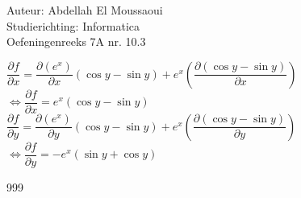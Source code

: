 \documentclass[a4paper]{article}
\begin{document}
  
\noindent \large Auteur: Abdellah El Moussaoui \\
\noindent \large Studierichting: Informatica\\
\noindent \large Oefeningenreeks 7A nr. 10.3\\

\medskip

\normalsize

$\dfrac{\partial f}{\partial x} = \dfrac{\partial (e^x)}{\partial x} (\cos y - \sin y) + e^x \left(\dfrac{\partial (\cos y - \sin y)}{\partial x}\right)$\\

$\Leftrightarrow \dfrac{\partial f}{\partial x} = e^x (\cos y - \sin y)$\\

$\dfrac{\partial f}{\partial y} = \dfrac{\partial (e^x)}{\partial y} (\cos y - \sin y) + e^x \left(\dfrac{\partial (\cos y - \sin y)}{\partial y}\right)$\\

$\Leftrightarrow\dfrac{\partial f}{\partial y} = -e^x (\sin y + \cos y)$\\

\begin{thebibliography}{999}
\end{thebibliography}
\end{document}
